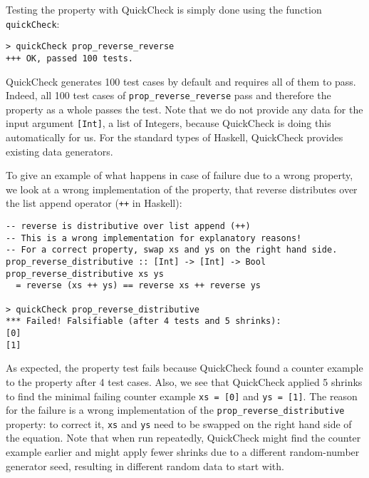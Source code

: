 Testing the property with QuickCheck is simply done using the function \\ \texttt{quickCheck}:

\begin{footnotesize}
\begin{verbatim}
> quickCheck prop_reverse_reverse
+++ OK, passed 100 tests.
\end{verbatim}
\end{footnotesize}

QuickCheck generates 100 test cases by default and requires all of them to pass. Indeed, all 100 test cases of \texttt{prop\_reverse\_reverse} pass and therefore the property as a whole passes the test. Note that we do not provide any data for the input argument \texttt{[Int]}, a list of Integers, because QuickCheck is doing this automatically for us. For the standard types of Haskell, QuickCheck provides existing data generators.

To give an example of what happens in case of failure due to a  wrong property, we look at a wrong implementation of the property, that reverse distributes over the list append operator (\texttt{++} in Haskell):

\begin{footnotesize}
\begin{verbatim}
-- reverse is distributive over list append (++)
-- This is a wrong implementation for explanatory reasons!
-- For a correct property, swap xs and ys on the right hand side.
prop_reverse_distributive :: [Int] -> [Int] -> Bool
prop_reverse_distributive xs ys 
  = reverse (xs ++ ys) == reverse xs ++ reverse ys
  
> quickCheck prop_reverse_distributive
*** Failed! Falsifiable (after 4 tests and 5 shrinks):    
[0]
[1]
\end{verbatim}
\end{footnotesize}

As expected, the property test fails because QuickCheck found a counter example to the property after 4 test cases. Also, we see that QuickCheck applied 5 shrinks to find the minimal failing counter example \texttt{xs = [0]} and \texttt{ys = [1]}. The reason for the failure is a wrong implementation of the \texttt{prop\_reverse\_distributive} property: to correct it, \texttt{xs} and \texttt{ys} need to be swapped on the right hand side of the equation. Note that when run repeatedly, QuickCheck might find the counter example earlier and might apply fewer shrinks due to a different random-number generator seed, resulting in different random data to start with.

